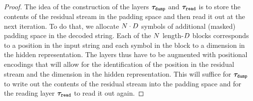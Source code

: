 \begin{proof}
   The idea of the construction of the layers ${{{{\boldsymbol{\tau}}}_{\texttt{dump}}}}$ and ${{{{\boldsymbol{\tau}}}_{\texttt{read}}}}$ is to store the contents of the residual stream in the padding space and then read it out at the next iteration.
   To do that, we allocate ${{N}} \cdot {{D}}$ symbols of additional (masked) padding space in the decoded string.
   Each of the ${{N}}$ length-${{D}}$ blocks corresponds to a position in the input string and each symbol in the block to a dimension in the hidden representation.
   The layers thus have to be augmented with positional encodings that will allow for the identification of the position in the residual stream and the dimension in the hidden representation.
   This will suffice for ${{{{\boldsymbol{\tau}}}_{\texttt{dump}}}}$ to write out the contents of the residual stream into the padding space and for the reading layer ${{{{\boldsymbol{\tau}}}_{\texttt{read}}}}$ to read it out again.
   

\end{proof}
